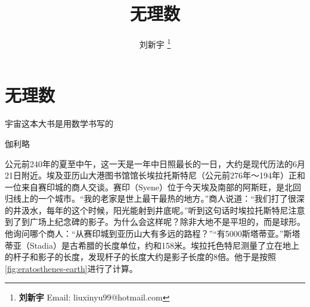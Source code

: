 \documentclass[b5paper]{ctexart}
\begin{document}
\title{无理数}

\author{刘新宇
\thanks{{\bfseries 刘新宇} \newline
  Email: liuxinyu99@hotmail.com \newline}
  }

\maketitle
\fi


\ifx\wholebook\relax
\chapter{无理数}
\fi

\epigraph{宇宙这本大书是用数学书写的}{伽利略}

公元前240年的夏至中午，这一天是一年中日照最长的一日，大约是现代历法的6月21日附近。埃及亚历山大港图书馆馆长埃拉托斯特尼（公元前276年～194年）正和一位来自赛印城的商人交谈。赛印（Syene）位于今天埃及南部的阿斯旺，是北回归线上的一个城市。“我的老家是世上最干最热的地方。”商人说道：“我们打了很深的井汲水，每年的这个时候，阳光能射到井底呢。”听到这句话时埃拉托斯特尼注意到了到广场上纪念碑的影子。为什么会这样呢？除非大地不是平坦的，而是球形。他询问哪个商人：“从赛印城到亚历山大有多远的路程？”“有5000斯塔蒂亚。”斯塔蒂亚（Stadia）是古希腊的长度单位，约和158米。埃拉托色特尼测量了立在地上的杆子和影子的长度，发现杆子的长度大约是影子长度的8倍。他于是按照\cref{fig:eratosthenes-earth}进行了计算。
\end{document}
